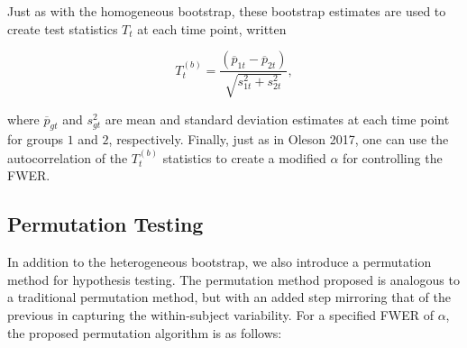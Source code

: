 Just as with the homogeneous bootstrap, these bootstrap estimates are used to create test statistics $T_t$ at each time point, written

\begin{equation}
T_t^{(b)} = \frac{(\overline{p}_{1t} - \overline{p}_{2t})}{\sqrt{s_{1t}^2 + s_{2t}^2}},
\end{equation}

where $\overline{p}_{gt}$ and $s_{gt}^2$ are mean and standard deviation estimates at each time point for groups $1$ and $2$, respectively. Finally, just as in Oleson 2017, one can use the autocorrelation of the $T_t^{(b)}$ statistics to create a modified $\alpha$ for controlling the FWER.





\subsection{Permutation Testing}

In addition to the heterogeneous bootstrap, we also introduce a permutation method for hypothesis testing. The permutation method proposed is analogous to a traditional permutation method, but with an added step mirroring that of the previous in capturing the within-subject variability. For a specified FWER of $\alpha$, the proposed permutation algorithm is as follows:


